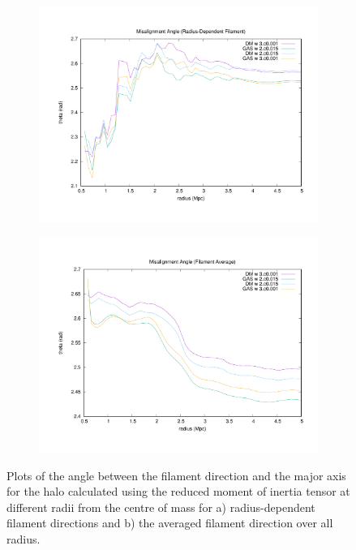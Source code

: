 \documentclass[journal]{IEEEtran}
\begin{document}
\begin{figure}[!t]
\centering
	\begin{subfigure}[t]{0.45\textwidth}
		\centering
		\includegraphics[width=\linewidth]{MisRad}
	\end{subfigure}
	\quad
	\begin{subfigure}[t]{0.45\textwidth}
		\centering
		\includegraphics[width=\linewidth]{MisAve}
	\end{subfigure}
\label{fig:angleplots}
	\caption{Plots of the angle between the filament direction and the major axis for the halo calculated using the reduced moment of inertia tensor at different radii from the centre of mass for a) radius-dependent filament directions and b) the averaged filament direction over all radius.}
\end{figure}
\end{document}
